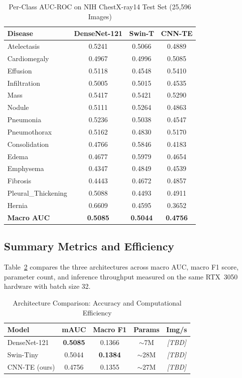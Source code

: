 \documentclass[conference]{IEEEtran}
\begin{document}
\begin{table}[!t]
\renewcommand{\arraystretch}{1.2}
\caption{Per-Class AUC-ROC on NIH ChestX-ray14 Test Set (25,596 Images)}
\label{tab:auc_results}
\centering
\begin{tabular}{lccc}
\toprule
\textbf{Disease} & \textbf{DenseNet-121} & \textbf{Swin-T} &
\textbf{CNN-TE} \\
\midrule
Atelectasis         & 0.5241 & 0.5066 & 0.4889 \\
Cardiomegaly        & 0.4967 & 0.4996 & 0.5085 \\
Effusion            & 0.5118 & 0.4548 & 0.5410 \\
Infiltration        & 0.5005 & 0.5015 & 0.4535 \\
Mass                & 0.5417 & 0.5421 & 0.5290 \\
Nodule              & 0.5111 & 0.5264 & 0.4863 \\
Pneumonia           & 0.5236 & 0.5038 & 0.4547 \\
Pneumothorax        & 0.5162 & 0.4830 & 0.5170 \\
Consolidation       & 0.4766 & 0.5846 & 0.4183 \\
Edema               & 0.4677 & 0.5979 & 0.4654 \\
Emphysema           & 0.4347 & 0.4849 & 0.4539 \\
Fibrosis            & 0.4443 & 0.4672 & 0.4857 \\
Pleural\_Thickening & 0.5088 & 0.4493 & 0.4911 \\
Hernia              & 0.6609 & 0.4595 & 0.3652 \\
\midrule
\textbf{Macro AUC}  & \textbf{0.5085} & \textbf{0.5044} & \textbf{0.4756} \\
\bottomrule
\end{tabular}
\end{table}

\subsection{Summary Metrics and Efficiency}

Table~\ref{tab:summary} compares the three architectures across macro
AUC, macro F1 score, parameter count, and inference throughput
measured on the same RTX~3050 hardware with batch size 32.

\begin{table}[!t]
\renewcommand{\arraystretch}{1.2}
\caption{Architecture Comparison: Accuracy and Computational Efficiency}
\label{tab:summary}
\centering
\begin{tabular}{lcccc}
\toprule
\textbf{Model} & \textbf{mAUC} & \textbf{Macro F1} &
\textbf{Params} & \textbf{Img/s} \\
\midrule
DenseNet-121  & \textbf{0.5085} & 0.1366 & $\sim$7M  & \textit{[TBD]} \\
Swin-Tiny     & 0.5044          & \textbf{0.1384} & $\sim$28M & \textit{[TBD]} \\
CNN-TE (ours) & 0.4756          & 0.1355 & $\sim$27M & \textit{[TBD]} \\
\bottomrule
\end{tabular}
\end{table}
\end{document}

